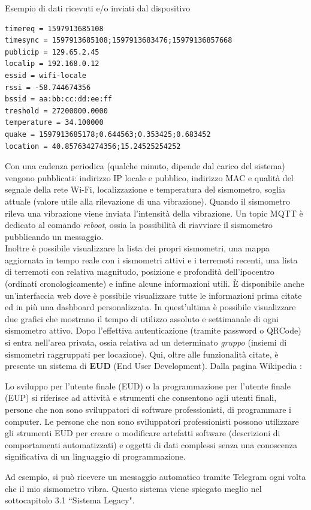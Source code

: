 \documentclass[a4paper,10pt]{memoir}
\begin{document}
\begin{center}
Esempio di dati ricevuti e/o inviati dal dispositivo
\end{center}
\begin{lstlisting}[numbers=none]
timereq = 1597913685108
timesync = 1597913685108;1597913683476;15979136857668
publicip = 129.65.2.45
localip = 192.168.0.12
essid = wifi-locale
rssi = -58.744674356
bssid = aa:bb:cc:dd:ee:ff
treshold = 27200000.0000
temperature = 34.100000
quake = 1597913685178;0.644563;0.353425;0.683452
location = 40.857634274356;15.24525254252
\end{lstlisting}
Con una cadenza periodica (qualche minuto, dipende dal carico del sistema) vengono pubblicati: indirizzo IP locale e pubblico, indirizzo MAC e qualità del segnale della rete Wi-Fi, localizzazione e temperatura del sismometro, soglia attuale (valore utile alla rilevazione di una vibrazione).
Quando il sismometro rileva una vibrazione viene inviata l'intensità della vibrazione.
Un topic MQTT è dedicato al comando \textit{reboot}, ossia la possibilità di riavviare il sismometro pubblicando un messaggio.\\
Inoltre è possibile visualizzare la lista dei propri sismometri, una mappa aggiornata in tempo reale con i sismometri attivi e i terremoti recenti, una lista di terremoti con relativa magnitudo, posizione e profondità dell'ipocentro (ordinati cronologicamente) e infine alcune informazioni utili.
È disponibile anche un'interfaccia web dove è possibile visualizzare tutte le informazioni prima citate ed in più una dashboard personalizzata.
In quest'ultima è possibile visualizzare due grafici che mostrano il tempo di utilizzo assoluto e settimanale di ogni sismometro attivo.
Dopo l'effettiva autenticazione (tramite password o QRCode) si entra nell'area privata, ossia relativa ad un determinato \textit{gruppo} (insiemi di sismometri raggruppati per locazione).
Qui, oltre alle funzionalità citate, è presente un sistema di \textbf{EUD} (End User Development).
Dalla pagina Wikipedia \cite{wikieud}:
\begin{quoting}[font=itshape, begintext={``}, endtext={``}]
Lo sviluppo per l'utente finale (EUD) o la programmazione per l'utente finale (EUP) si riferisce ad attività e strumenti che consentono agli utenti finali, persone che non sono sviluppatori di software professionisti, di programmare i computer. Le persone che non sono sviluppatori professionisti possono utilizzare gli strumenti EUD per creare o modificare artefatti software (descrizioni di comportamenti automatizzati) e oggetti di dati complessi senza una conoscenza significativa di un linguaggio di programmazione.
\end{quoting}
Ad esempio, si può ricevere un messaggio automatico tramite Telegram ogni volta che il mio sismometro vibra. Questo sistema viene spiegato meglio nel sottocapitolo 3.1 ``Sistema Legacy".
\end{document}
